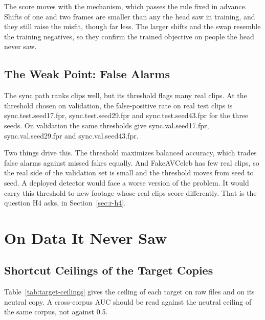 The score moves with the mechanism, which passes the rule fixed in advance. Shifts
of one and two frames are smaller than any the head saw in training, and they
still raise the misfit, though far less. The larger shifts and the swap
resemble the training negatives, so they confirm the trained objective on
people the head never saw.

\subsection{The Weak Point: False Alarms}

The sync path ranks clips well, but its threshold flags many real clips. At
the threshold chosen on validation, the false-positive rate on real test clips
is {{sync.test.seed17.fpr}}, {{sync.test.seed29.fpr}} and
{{sync.test.seed43.fpr}} for the three seeds. On validation the same
thresholds give {{sync.val.seed17.fpr}}, {{sync.val.seed29.fpr}} and
{{sync.val.seed43.fpr}}.

Two things drive this. The threshold maximizes balanced accuracy, which trades
false alarms against missed fakes equally. And FakeAVCeleb has few real clips,
so the real side of the validation set is small and the threshold moves from
seed to seed. A deployed detector would face a worse version of the problem.
It would carry this threshold to new footage whose real clips score
differently. That is the question H4 asks, in Section~\ref{sec:r-h4}.

\section{On Data It Never Saw}
\label{sec:r-new}

\subsection{Shortcut Ceilings of the Target Copies}

Table~\ref{tab:target-ceilings} gives the ceiling of each target on raw files
and on its neutral copy. A cross-corpus AUC should be read against the neutral
ceiling of the same corpus, not against 0.5.

